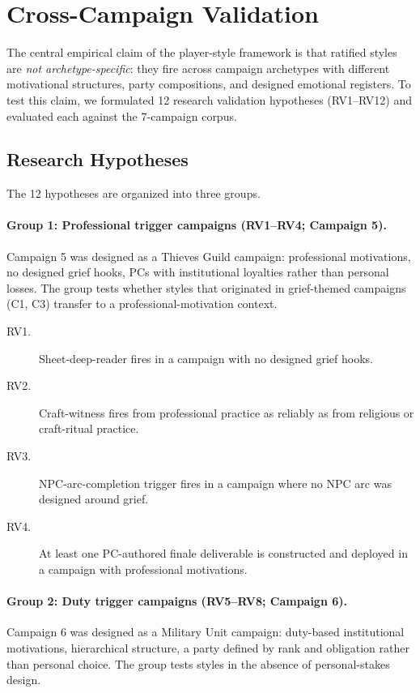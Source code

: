 
\section{Cross-Campaign Validation}
\label{sec:evaluation}

The central empirical claim of the player-style framework is that ratified styles are
\textit{not archetype-specific}: they fire across campaign archetypes with different
motivational structures, party compositions, and designed emotional registers. To test
this claim, we formulated 12 research validation hypotheses (RV1--RV12) and evaluated
each against the 7-campaign corpus.

\subsection{Research Hypotheses}

The 12 hypotheses are organized into three groups.

\paragraph{Group 1: Professional trigger campaigns (RV1--RV4; Campaign 5).}
Campaign 5 was designed as a Thieves Guild campaign: professional motivations, no
designed grief hooks, PCs with institutional loyalties rather than personal losses.
The group tests whether styles that originated in grief-themed campaigns (C1, C3)
transfer to a professional-motivation context.

\begin{description}
  \item[RV1.] Sheet-deep-reader fires in a campaign with no designed grief hooks.
  \item[RV2.] Craft-witness fires from professional practice as reliably as from
    religious or craft-ritual practice.
  \item[RV3.] NPC-arc-completion trigger fires in a campaign where no NPC arc was
    designed around grief.
  \item[RV4.] At least one PC-authored finale deliverable is constructed and deployed
    in a campaign with professional motivations.
\end{description}

\paragraph{Group 2: Duty trigger campaigns (RV5--RV8; Campaign 6).}
Campaign 6 was designed as a Military Unit campaign: duty-based institutional
motivations, hierarchical structure, a party defined by rank and obligation rather
than personal choice. The group tests styles in the absence of personal-stakes design.

